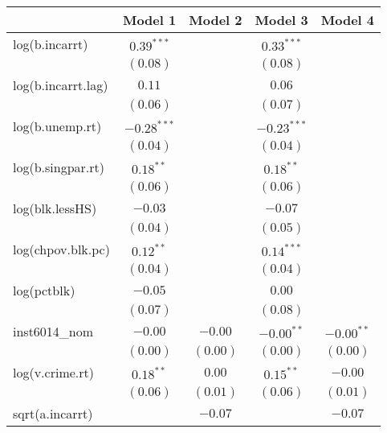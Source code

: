 
\begin{table}
\begin{center}
\begin{tabular}{l c c c c }
\hline
 & Model 1 & Model 2 & Model 3 & Model 4 \\
\hline
log(b.incarrt)       & $0.39^{***}$  &               & $0.33^{***}$  &               \\
                     & $(0.08)$      &               & $(0.08)$      &               \\
log(b.incarrt.lag)   & $0.11$        &               & $0.06$        &               \\
                     & $(0.06)$      &               & $(0.07)$      &               \\
log(b.unemp.rt)      & $-0.28^{***}$ &               & $-0.23^{***}$ &               \\
                     & $(0.04)$      &               & $(0.04)$      &               \\
log(b.singpar.rt)    & $0.18^{**}$   &               & $0.18^{**}$   &               \\
                     & $(0.06)$      &               & $(0.06)$      &               \\
log(blk.lessHS)      & $-0.03$       &               & $-0.07$       &               \\
                     & $(0.04)$      &               & $(0.05)$      &               \\
log(chpov.blk.pc)    & $0.12^{**}$   &               & $0.14^{***}$  &               \\
                     & $(0.04)$      &               & $(0.04)$      &               \\
log(pctblk)          & $-0.05$       &               & $0.00$        &               \\
                     & $(0.07)$      &               & $(0.08)$      &               \\
inst6014\_nom        & $-0.00$       & $-0.00$       & $-0.00^{**}$  & $-0.00^{**}$  \\
                     & $(0.00)$      & $(0.00)$      & $(0.00)$      & $(0.00)$      \\
log(v.crime.rt)      & $0.18^{**}$   & $0.00$        & $0.15^{**}$   & $-0.00$       \\
                     & $(0.06)$      & $(0.01)$      & $(0.06)$      & $(0.01)$      \\
sqrt(a.incarrt)      &               & $-0.07$       &               & $-0.07$       \\

\end{tabular}
\end{center}
\end{table}
